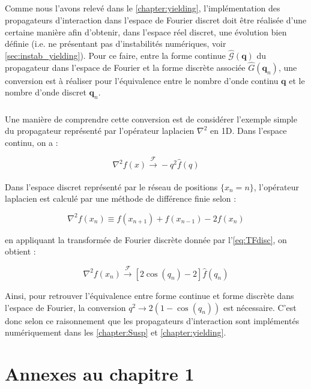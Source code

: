 \label{sec:impl_disc_propag}

\subparagraph{}Comme nous l'avons relevé dans le \autoref{chapter:yielding}, l'implémentation des propagateurs d'interaction dans l'espace de Fourier discret doit être réalisée d'une certaine manière afin d'obtenir, dans l'espace réel discret, une évolution bien définie (i.e. ne présentant pas d'instabilités numériques, voir \autoref{sec:instab_yielding}). Pour ce faire, entre la forme continue $\hat{\mathcal{G}}(\mathbf{q})$ du propagateur dans l'espace de Fourier et la forme discrète associée $\hat{G}(\mathbf{q}_n)$, une conversion est à réaliser pour l'équivalence entre le nombre d'onde continu $\mathbf{q}$ et le nombre d'onde discret $\mathbf{q}_n$. 

\subparagraph{}Une manière de comprendre cette conversion est de considérer l'exemple simple du propagateur représenté par l'opérateur laplacien $\nabla^2$ en 1D. Dans l'espace continu, on a :

\begin{equation}
	\nabla^2 f(x) \xrightarrow[]{\mathcal{F}} -q^2 \hat{f}(q)
\end{equation}

\noindent Dans l'espace discret représenté par le réseau de positions $\{x_n = n\}$, l'opérateur laplacien est calculé par une méthode de différence finie selon :

\begin{equation}
	\nabla^2 f(x_n) \equiv f(x_{n+1})+f(x_{n-1})-2f(x_n)
\end{equation}

\noindent en appliquant la transformée de Fourier discrète donnée par l'\autoref{eq:TFdisc}, on obtient :

\begin{equation}
	\nabla^2 f(x_n) \xrightarrow[]{\mathcal{F}} [2\cos(q_n)-2]\hat{f}(q_n)
\end{equation}

\noindent Ainsi, pour retrouver l'équivalence entre forme continue et forme discrète dans l'espace de Fourier, la conversion $q^2 \rightarrow 2(1-\cos (q_n))$ est nécessaire. C'est donc selon ce raisonnement que les propagateurs d'interaction sont implémentés numériquement dans les \autoref{chapter:Susp} et \autoref{chapter:yielding}.

\section{Annexes au chapitre 1}

